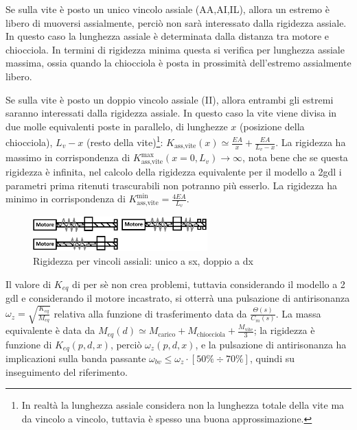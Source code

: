 Se sulla vite è posto un unico vincolo assiale (AA,AI,IL), allora un estremo è libero di muoversi assialmente, perciò non sarà interessato dalla rigidezza assiale.
In questo caso la lunghezza assiale è determinata dalla distanza tra motore e chiocciola.
In termini di rigidezza minima questa si verifica per lunghezza assiale massima, ossia quando la chiocciola è posta in prossimità dell'estremo assialmente libero.

Se sulla vite è posto un doppio vincolo assiale (II), allora entrambi gli estremi saranno interessati dalla rigidezza assiale.
In questo caso la vite viene divisa in due molle equivalenti poste in parallelo, di lunghezze \(x\) (posizione della chiocciola), \(L_v - x\) (resto della vite)\footnote{In realtà la lunghezza assiale considera non la lunghezza totale della vite ma da vincolo a vincolo, tuttavia è spesso una buona approssimazione.}: \(K_\text{ass,vite}(x) \simeq \frac{EA}{x} + \frac{EA}{L_v - x} \).
La rigidezza ha massimo in corrispondenza di \( K_\text{ass,vite}^\text{max} (x=0,L_v) \rightarrow \infty \), nota bene che se questa rigidezza è infinita, nel calcolo della rigidezza equivalente per il modello a 2gdl i parametri prima ritenuti trascurabili non potranno più esserlo.
La rigidezza ha minimo in corrispondenza di \(K_\text{ass,vite}^\text{min} = \frac{4EA}{L_v} \).

\begin{figure}[h]
    \centering
    \includegraphics[width=0.6\textwidth]{Immagini/rigidezza_ass_1vs2_vincoli.png}
    \caption{Rigidezza per vincoli assiali: unico a sx, doppio a dx}
\end{figure}

Il valore di \(K_{eq}\) di per sè non crea problemi, tuttavia considerando il modello a 2 gdl e considerando il motore incastrato, si otterrà una pulsazione di antirisonanza \(\omega_z = \sqrt{\frac{K_{eq}}{M_{eq}}}\) relativa alla funzione di trasferimento data da \( \frac{\Theta(s)}{C_m(s)} \).
La massa equivalente è data da \( M_{eq}(d) \simeq M_\text{carico} + M_\text{chiocciola} + \frac{M_\text{vite}}{3} \); la rigidezza è funzione di \( K_{eq}(p,d,x) \), perciò \(\omega_z (p,d,x)\), e la pulsazione di antirisonanza ha implicazioni sulla banda passante \( \omega_{bv} \leqslant \omega_z \cdot [50\% \div 70\%] \), quindi su inseguimento del riferimento.

